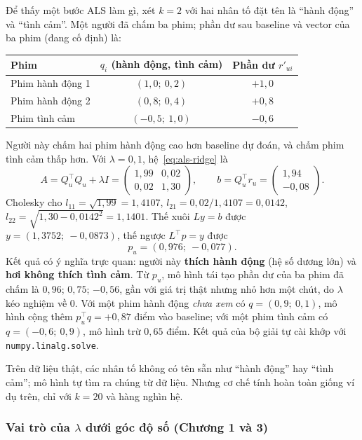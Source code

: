 Để thấy một bước ALS làm gì, xét $k = 2$ với hai nhân tố đặt tên là ``hành động'' và ``tình cảm''.
Một người đã chấm ba phim; phần dư sau baseline và vector của ba phim (đang cố định) là:
\begin{center}
\begin{tabular}{lcc}
  \hline
  Phim & $q_i$ (hành động, tình cảm) & Phần dư $r'_{ui}$ \\
  \hline
  Phim hành động 1 & $(1{,}0;\ 0{,}2)$ & $+1{,}0$ \\
  Phim hành động 2 & $(0{,}8;\ 0{,}4)$ & $+0{,}8$ \\
  Phim tình cảm    & $(-0{,}5;\ 1{,}0)$ & $-0{,}6$ \\
  \hline
\end{tabular}
\end{center}
Người này chấm hai phim hành động cao hơn baseline dự đoán, và chấm phim tình cảm thấp hơn. Với
$\lambda = 0{,}1$, hệ~\eqref{eq:als-ridge} là
\[
  A = Q_u^\top Q_u + \lambda I = \begin{pmatrix} 1{,}99 & 0{,}02 \\ 0{,}02 & 1{,}30 \end{pmatrix},
  \qquad
  b = Q_u^\top r_u = \begin{pmatrix} 1{,}94 \\ -0{,}08 \end{pmatrix}.
\]
Cholesky cho $l_{11} = \sqrt{1{,}99} = 1{,}4107$, $l_{21} = 0{,}02/1{,}4107 = 0{,}0142$,
$l_{22} = \sqrt{1{,}30 - 0{,}0142^2} = 1{,}1401$. Thế xuôi $Ly = b$ được $y = (1{,}3752;\ -0{,}0873)$,
thế ngược $L^\top p = y$ được
\[
  p_u = (0{,}976;\ -0{,}077).
\]
Kết quả có ý nghĩa trực quan: người này \textbf{thích hành động} (hệ số dương lớn) và \textbf{hơi không
thích tình cảm}. Từ $p_u$, mô hình tái tạo phần dư của ba phim đã chấm là $0{,}96$; $0{,}75$; $-0{,}56$,
gần với giá trị thật nhưng nhỏ hơn một chút, do $\lambda$ kéo nghiệm về 0. Với một phim hành động
\emph{chưa xem} có $q = (0{,}9;\ 0{,}1)$, mô hình cộng thêm $p_u^\top q = +0{,}87$ điểm vào baseline;
với một phim tình cảm có $q = (-0{,}6;\ 0{,}9)$, mô hình trừ $0{,}65$ điểm. Kết quả của bộ giải tự cài
khớp với \texttt{numpy.linalg.solve}.

Trên dữ liệu thật, các nhân tố không có tên sẵn như ``hành động'' hay ``tình cảm''; mô hình tự tìm ra
chúng từ dữ liệu. Nhưng cơ chế tính hoàn toàn giống ví dụ trên, chỉ với $k = 20$ và hàng nghìn hệ.

\subsubsection{Vai trò của $\lambda$ dưới góc độ số (Chương 1 và 3)}


